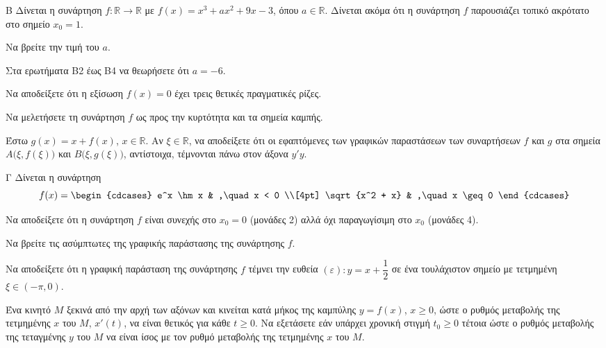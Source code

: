 
\begin{thema}{Β}
Δίνεται η συνάρτηση $f: \mathbb{R} \to \mathbb{R}$ με $f(x) = x^3 + a x^2 + 9x - 3$, όπου $a \in \mathbb{R}$. Δίνεται ακόμα ότι η συνάρτηση $f$ παρουσιάζει τοπικό ακρότατο στο σημείο $x_0 = 1$.
\begin{erwthma}
    \item Να βρείτε την τιμή του $a$. 

Στα ερωτήματα Β2 έως Β4 να θεωρήσετε ότι $a = -6$.

    \item Να αποδείξετε ότι η εξίσωση $f(x) = 0$ έχει τρεις θετικές πραγματικές ρίζες. 

    \item Να μελετήσετε τη συνάρτηση $f$ ως προς την κυρτότητα και τα σημεία καμπής. 

    \item Έστω $g(x) = x + f(x)$, $x \in \mathbb{R}$. Αν $\xi \in \mathbb{R}$, να αποδείξετε ότι οι εφαπτόμενες των γραφικών παραστάσεων των συναρτήσεων $f$ και $g$ στα σημεία $A\bigl(\xi, f(\xi)\bigr)$ και $B\bigl(\xi, g(\xi)\bigr)$, αντίστοιχα, τέμνονται πάνω στον άξονα $y'y$. 

\end{erwthma}
\end{thema}

\begin{thema}{Γ}
Δίνεται η συνάρτηση
\[
f(x) =
\begin{cdcases}
e^x \hm x & ,\quad x < 0 \\[4pt]
\sqrt{x^2 + x} & ,\quad x \geq 0
\end{cdcases}
\]
\begin{erwthma}
    \item Να αποδείξετε ότι η συνάρτηση $f$ είναι συνεχής στο $x_0 = 0$ (μονάδες 2) αλλά όχι παραγωγίσιμη στο $x_0$ (μονάδες 4). 

    \item Να βρείτε τις ασύμπτωτες της γραφικής παράστασης της συνάρτησης $f$. 

    \item Να αποδείξετε ότι η γραφική παράσταση της συνάρτησης $f$ τέμνει την ευθεία $(\varepsilon)\colon y = x + \dfrac{1}{2}$ σε ένα τουλάχιστον σημείο με τετμημένη $\xi \in (-\pi, 0)$. 

    \item Ένα κινητό $M$ ξεκινά από την αρχή των αξόνων και κινείται κατά μήκος της καμπύλης $y = f(x)$, $x \geq 0$, ώστε ο ρυθμός μεταβολής της τετμημένης $x$ του $M$, $x'(t)$, να είναι θετικός για κάθε $t \geq 0$. Να εξετάσετε εάν υπάρχει χρονική στιγμή $t_0 \geq 0$ τέτοια ώστε ο ρυθμός μεταβολής της τεταγμένης $y$ του $M$ να είναι ίσος με τον ρυθμό μεταβολής της τετμημένης $x$ του $M$. 
\end{erwthma}
\end{thema}

